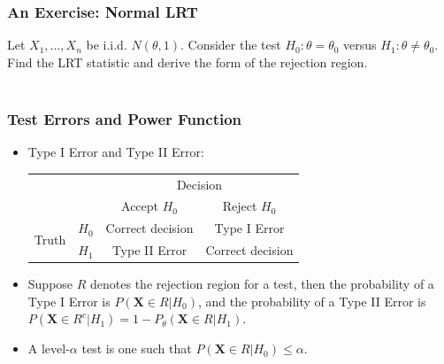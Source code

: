 \documentclass{beamer}
\begin{document}

\begin{frame}
\frametitle{An Exercise: Normal LRT}
Let $X_1,\ldots,X_n$ be i.i.d. $N(\theta,1)$. Consider the test $H_0: \theta=\theta_0$ versus $H_1: \theta \neq \theta_0$. Find the LRT statistic and derive the form of the rejection region.
\\~\\
\end{frame}

\begin{frame}
\frametitle{Test Errors and Power Function}
\begin{itemize}
\item Type I Error and Type II Error:
\begin{table}
\centering
\begin{tabular}{cc|c|c|}
\toprule
 &  & \multicolumn{2}{|c|}{Decision}\\
 &  & Accept $H_0$ & Reject $H_0$ \\
\hline 
\multirow{2}{*}{Truth} & $H_0$ & Correct decision & Type I Error\\
\cline{3-4}
 & $H_1$ & Type II Error & Correct decision\\
\bottomrule
\end{tabular}
\end{table}
\bigskip
\item Suppose $R$ denotes the rejection region for a test, then the probability of a Type I Error is $P(\mathbf{X}\in R|H_0)$, and the probability of a Type II Error is $P(\mathbf{X}\in R^c|H_1)=1-P_{\theta}(\mathbf{X}\in R|H_1)$.
\item A level-$\alpha$ test is one such that $P(\mathbf{X}\in R|H_0) \leq \alpha$.
\end{itemize}
\end{frame}
\end{document}
